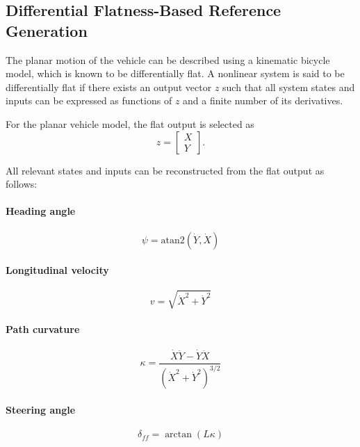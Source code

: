 \documentclass[letterpaper]{ifacconf}
\begin{document}
\subsection{Differential Flatness-Based Reference Generation}

The planar motion of the vehicle can be described using a kinematic bicycle model, which is known to be differentially flat. A nonlinear system is said to be differentially flat if there exists an output vector $z$ such that all system states and inputs can be expressed as functions of $z$ and a finite number of its derivatives.

For the planar vehicle model, the flat output is selected as
\begin{equation}
z =
\begin{bmatrix}
X \\
Y
\end{bmatrix}.
\end{equation}

All relevant states and inputs can be reconstructed from the flat output as follows:

\paragraph{Heading angle}
\begin{equation}
\psi = \text{atan2}(\dot{Y}, \dot{X})
\end{equation}

\paragraph{Longitudinal velocity}
\begin{equation}
v = \sqrt{\dot{X}^2 + \dot{Y}^2}
\end{equation}

\paragraph{Path curvature}
\begin{equation}
\kappa =
\frac{\dot{X}\ddot{Y} - \dot{Y}\ddot{X}}
{(\dot{X}^2 + \dot{Y}^2)^{3/2}}
\end{equation}

\paragraph{Steering angle}
\begin{equation}
\delta_{ff} = \arctan(L \kappa)
\end{equation}
\end{document}

